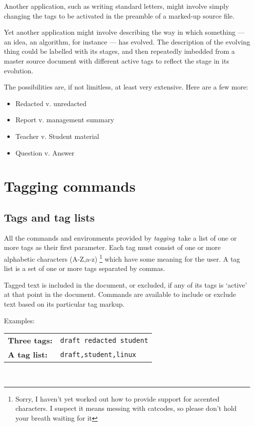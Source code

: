 \documentclass[a4paper,12pt,twoside,openany]{memoir}
\newcommand{\tpname}{\textsf{\itshape tagging}}
\begin{document}
Another application, such as writing standard letters,
might involve simply changing the tags to be activated
in the preamble of a marked-up source file.

Yet another application might involve describing the way
in which something --- an idea, an algorithm, for instance --- has evolved.
The description of the evolving thing could be labelled with its stages,
and then repeatedly imbedded from a master source document with different
active tags to reflect the stage in its evolution. 

The possibilities are, if not limitless,
at least very extensive.
Here are a few more:
\begin{itemize}
\item Redacted v. unredacted
\item Report v. management summary
\item Teacher v. Student material
\item Question v. Answer
\end{itemize}
\chapter{Tagging commands}
\section{Tags and tag lists}
All the commands and environments provided by \tpname\
take a list of one or more tags as their first parameter.
Each tag must consist of one or more
alphabetic characters
(A-Z,a-z)%
\footnote{%
    Sorry, I haven't yet worked out
    how to provide support for accented characters.
    I suspect it means messing with catcodes,
    so please don't hold your breath waiting for it
}
which have some meaning for the user.
A tag list is a set of one or more tags separated by commas.

Tagged text is included in the document, or excluded,
if any of its tags is `active' at that point in the document.
Commands are available to include or exclude text based on its
particular tag markup.

Examples:

\begin{centering}
\begin{tabularx}{0.618\textwidth}{lX}
\textbf{Three tags:}&\texttt{draft redacted student}\\
\textbf{A tag list:}&\texttt{draft,student,linux}
\end{tabularx}\\[\baselineskip]
\end{centering}
\end{document}
